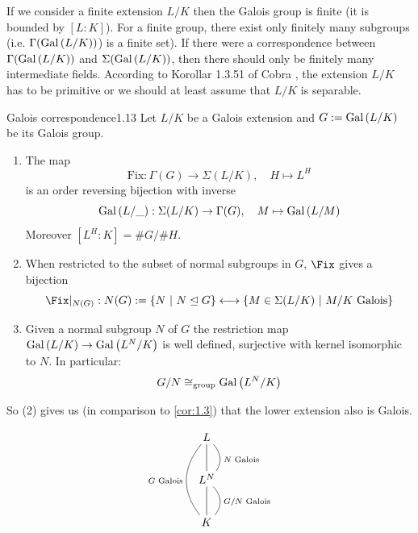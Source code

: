 \documentclass[twoside = false,	%
		headsepline,		%
		parskip = true,
		]{scrbook}						%
\begin{document}
        If we consider a finite extension $L/K$ then the Galois group is finite (it is bounded by $[L:K]$). For a finite group, there exist only finitely many subgroups (i.e. $\Gamma(\mathrm{Gal}\left( L/K\right))$) is a finite set). If there were a correspondence between $\Gamma(\mathrm{Gal}\left( L/K\right))$ and $\Sigma(\mathrm{Gal}\left( L/K\right))$, then there should only be finitely many intermediate fields. According to Korollar 1.3.51 of Cobra \cite{Cobra}, the extension $L/K$ has to be primitive or we should at least assume that $L/K$ is separable.
        
        \begin{theorem}{Galois correspondence}{1.13}
            Let $L/K$ be a Galois extension and $G:= \mathrm{Gal}\left( L/K\right)$ be its Galois group.
            \begin{enumerate}
                \item The map \[\mathrm{Fix}: \Gamma(G) \rightarrow \Sigma(L/K), \quad H \mapsto L^H\] is an order reversing bijection with inverse \[\mathrm{Gal}\left( L/\_\right): \Sigma(L/K) \rightarrow \Gamma(G), \quad M \mapsto \mathrm{Gal}\left( L/M\right)\] Moreover $[L^H:K] = \#G/\#H$.
                \item When restricted to the subset of normal subgroups in $G$, $\Fix$ gives a bijection
                \[\Fix|_{N(G)}: N(G):= \{ N \ | \ N \trianglelefteq G\} \longleftrightarrow \{M \in \Sigma(L/K) \ | \ M/K \text{ Galois}\}\]
                \item Given a normal subgroup $N$ of $G$ the restriction map $\mathrm{Gal}\left( L/K\right) \rightarrow \mathrm{Gal}\left( L^N/K\right)$ is well defined, surjective with kernel isomorphic to $N$. In particular:
                \begin{equation*}
                    G/N \cong_{\text{group}} \mathrm{Gal}\left( L^N/K\right)
                \end{equation*}
            \end{enumerate}
        \end{theorem}
        
        So (2) gives us (in comparison to \ref{cor:1.3}) that the lower extension also is Galois.
        
        \begin{equation*}
            \xymatrix
            {
            L\ar@{-}[d]\ar@/_1.5pc/@{-}[dd]_{G\text{ Galois}}
            \ar@/^1pc/@{-}[d]^{N \text{ Galois}}\\
            L^N\ar@{-}[d]\ar@/^1pc/@{-}[d]^{G/N\text{ Galois}} \\
            K
            }
        \end{equation*}
        
\end{document}
